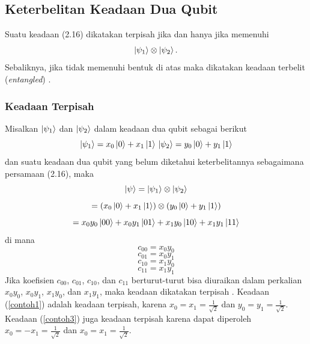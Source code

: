 \subsection{Keterbelitan Keadaan Dua Qubit}
\par
Suatu keadaan (2.16) dikatakan terpisah jika dan hanya jika memenuhi
\begin{equation}
	\ket{\psi_1}\otimes\ket{\psi_2}.
\end{equation}
Sebaliknya, jika tidak memenuhi bentuk di atas maka dikatakan keadaan terbelit (\textit{entangled}) \cite{esteve2004quantum}.

\subsubsection{Keadaan Terpisah}
Misalkan $\ket{\psi_1}$ dan $\ket{\psi_2}$ dalam keadaan dua qubit sebagai berikut
\begin{equation}
	\ket{\psi_1}=x_0\ket{0}+x_1\ket{1}\\
	\ket{\psi_2}=y_0\ket{0}+y_1\ket{1}\label{2.34}
\end{equation}
dan suatu keadaan dua qubit yang belum diketahui keterbelitannya sebagaimana persamaan (2.16), maka
\begin{equation*}
	\ket{\psi}=\ket{\psi_1}\otimes\ket{\psi_2}
\end{equation*}
\begin{equation*}
	=(x_0\ket{0}+x_1\ket{1})\otimes(y_0\ket{0}+y_1\ket{1})
\end{equation*}
\begin{equation}
	=x_0y_0\ket{00}+x_0y_1\ket{01}+x_1y_0\ket{10}+x_1y_1\ket{11}
\end{equation}
di mana
\begin{equation*}
	c_{00}=x_0y_0
	\label{eq:terbelit1}
\end{equation*}
\begin{equation*}
	c_{01}=x_0y_1
	\label{eq:terbelit2}
\end{equation*}
\begin{equation*}
	c_{10}=x_1y_0
	\label{eq:terbelit3}
\end{equation*}
\begin{equation}
	c_{11}=x_1y_1
	\label{eq:terbelit4}
\end{equation}
Jika koefisien $c_{00}$, $c_{01}$, $c_{10}$, dan $c_{11}$ berturut-turut bisa diuraikan dalam perkalian $x_0y_0$, $x_0y_1$, $x_1y_0$, dan $x_1y_1$, maka keadaan dikatakan terpisah \cite{taufiqi2024asymmetric}. Keadaan (\ref{contoh1}) adalah keadaan terpisah, karena $x_0=x_1=\frac{1}{\sqrt{2}}$ dan $y_0=y_1=\frac{1}{\sqrt{2}}$. Keadaan (\ref{contoh3}) juga keadaan terpisah karena dapat diperoleh $x_0=-x_1=\frac{1}{\sqrt{2}}$ dan $x_0=x_1=\frac{1}{\sqrt{2}}$.

